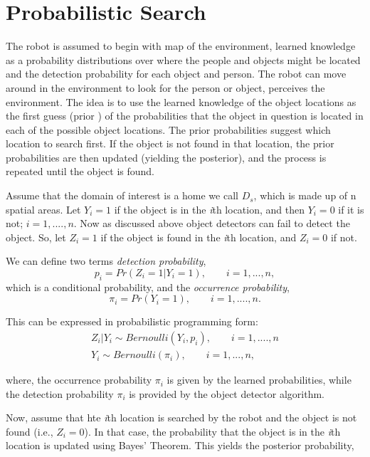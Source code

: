 \section{Probabilistic Search}

The robot is assumed to begin with map of the environment, learned knowledge as a probability distributions over where the people and objects might be located and the detection probability for each object and person. The robot can move around in the environment to look for the person or object, perceives the environment. 
The idea is to use the learned knowledge of the object locations as the first guess (prior ) of the probabilities that the object in question is located in each of the possible object locations. The prior probabilities suggest which location to search first. If the object is not found in that location, the prior probabilities are then updated (yielding the posterior), and the process is repeated until the object is found. 

Assume that the domain of interest is a home we call $D_s$, which is made up of n spatial areas. Let $Y_i = 1$ if the object is in the \emph{i}th location, and then $Y_i = 0$ if it is not; $ i = 1, .... , n$. Now as discussed above object detectors can fail to detect the object. So, let $Z_i = 1$ if the object is found in the \emph{i}th location, and $Z_i = 0$ if not.

We can define two terms \emph{detection probability},
\begin{equation}
	p_i = Pr(Z_i = 1| Y_i =1), \qquad  i = 1,...,n,
\end{equation}
which is a conditional probability, and the \emph{occurrence probability},
\begin{equation}
	\pi_i = Pr(Y_i = 1),\qquad  i = 1, .... , n.
\end{equation}

This can be expressed in probabilistic programming form:
\begin{gather}
	Z_i | Y_i \sim Bernoulli (Y_i, p_i), \qquad  i  = 1,....,n \\
	Y_i \sim Bernoulli(\pi_i),\qquad   i = 1,...,n,
\end{gather}

where, the occurrence probability {$\pi_i$} is given by the learned probabilities, while the detection probability {$\pi_i$} is provided by the object detector algorithm.

Now, assume that hte \emph{i}th location is searched by the robot and the object is not found (i.e., $Z_i = 0$). In that case, the probability that the object is in the \emph{i}th location is updated using Bayes' Theorem. This yields the posterior probability,


